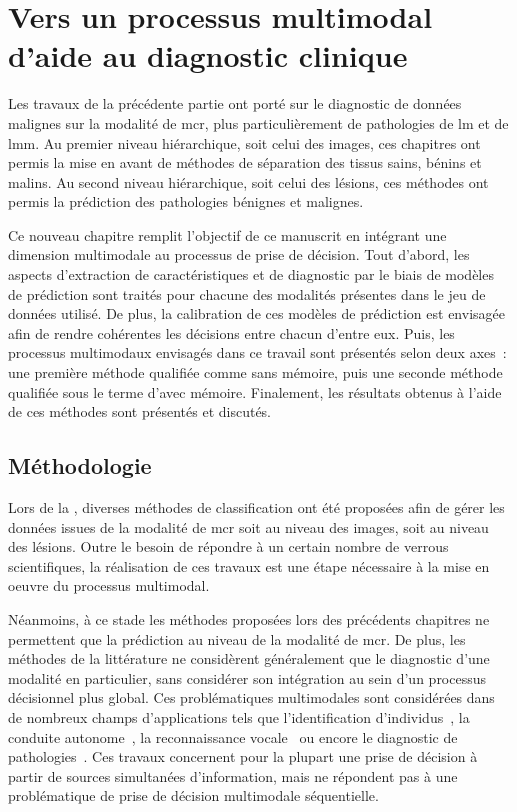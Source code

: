 \renewcommand{\thechapter}{\arabic{chapter}}
\setcounter{chapter}{7}

\chapter{Vers un processus multimodal d'aide au diagnostic clinique}
\label{chap:chapter_8}
\chapterintro
Les travaux de la précédente partie ont porté sur le diagnostic de données malignes sur la modalité de \acrlong{mcr}, plus particulièrement de pathologies de \acrlong{lm} et de \acrlong{lmm}. Au premier niveau hiérarchique, soit celui des images, ces chapitres ont permis la mise en avant de méthodes de séparation des tissus sains, bénins et malins. Au second niveau hiérarchique, soit celui des lésions, ces méthodes ont permis la prédiction des pathologies bénignes et malignes.\par

Ce nouveau chapitre remplit l'objectif de ce manuscrit en intégrant une dimension multimodale au processus de prise de décision. Tout d'abord, les aspects d'extraction de caractéristiques et de diagnostic par le biais de modèles de prédiction sont traités pour chacune des modalités présentes dans le jeu de données utilisé. De plus, la calibration de ces modèles de prédiction est envisagée afin de rendre cohérentes les décisions entre chacun d’entre eux. Puis, les processus multimodaux envisagés dans ce travail sont présentés selon deux axes~: une première méthode qualifiée comme sans mémoire, puis une seconde méthode qualifiée sous le terme d’avec mémoire. Finalement, les résultats obtenus à l'aide de ces méthodes sont présentés et discutés.\par
\newpage

\section{Méthodologie}
Lors de la , diverses méthodes de classification ont été proposées afin de gérer les données issues de la modalité de \gls{mcr} soit au niveau des images, soit au niveau des lésions. Outre le besoin de répondre à un certain nombre de verrous scientifiques, la réalisation de ces travaux est une étape nécessaire à la mise en oeuvre du processus multimodal.\par

Néanmoins, à ce stade les méthodes proposées lors des précédents chapitres ne permettent que la prédiction au niveau de la modalité de \gls{mcr}. De plus, les méthodes de la littérature ne considèrent généralement que le diagnostic d'une modalité en particulier, sans considérer son intégration au sein d'un processus décisionnel plus global. Ces problématiques multimodales sont considérées dans de nombreux champs d'applications tels que l'identification d'individus~\cite{Lupu2008}, la conduite autonome~\cite{Xiao2019}, la reconnaissance vocale~\cite{Ngiam2011} ou encore le diagnostic de pathologies~\cite{Lim2014, Liu2015a}. Ces travaux concernent pour la plupart une prise de décision à partir de sources simultanées d'information, mais ne répondent pas à une problématique de prise de décision multimodale séquentielle.\par

